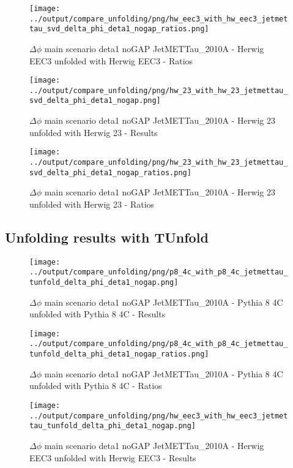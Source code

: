\documentclass[11pt]{book}
\begin{document}
\begin{figure}[ht]
\centering
\texttt{[image: ../output/compare\_unfolding/png/hw\_eec3\_with\_hw\_eec3\_jetmettau\_svd\_delta\_phi\_deta1\_nogap\_ratios.png]}
\caption{$\Delta\phi$ main scenario deta1 noGAP JetMETTau\_2010A - Herwig EEC3 unfolded with Herwig EEC3 - Ratios}
\label{hw_eec3_hw_eec3_jetmettau_svd_delta_phi_deta1_nogap_b}
\end{figure}

\begin{figure}[ht]
\centering
\texttt{[image: ../output/compare\_unfolding/png/hw\_23\_with\_hw\_23\_jetmettau\_svd\_delta\_phi\_deta1\_nogap.png]}
\caption{$\Delta\phi$ main scenario deta1 noGAP JetMETTau\_2010A - Herwig 23 unfolded with Herwig 23 - Results}
\label{hw_23_hw_23_jetmettau_svd_delta_phi_deta1_nogap_a}
\end{figure}

\begin{figure}[ht]
\centering
\texttt{[image: ../output/compare\_unfolding/png/hw\_23\_with\_hw\_23\_jetmettau\_svd\_delta\_phi\_deta1\_nogap\_ratios.png]}
\caption{$\Delta\phi$ main scenario deta1 noGAP JetMETTau\_2010A - Herwig 23 unfolded with Herwig 23 - Ratios}
\label{hw_23_hw_23_jetmettau_svd_delta_phi_deta1_nogap_b}
\end{figure}


\clearpage
\subsection{Unfolding results with TUnfold}

\begin{figure}[ht]
\centering
\texttt{[image: ../output/compare\_unfolding/png/p8\_4c\_with\_p8\_4c\_jetmettau\_tunfold\_delta\_phi\_deta1\_nogap.png]}
\caption{$\Delta\phi$ main scenario deta1 noGAP JetMETTau\_2010A - Pythia 8 4C unfolded with Pythia 8 4C - Results}
\label{p8_p8_jetmettau_tunfold_delta_phi_deta1_nogap_a}
\end{figure}

\begin{figure}[ht]
\centering
\texttt{[image: ../output/compare\_unfolding/png/p8\_4c\_with\_p8\_4c\_jetmettau\_tunfold\_delta\_phi\_deta1\_nogap\_ratios.png]}
\caption{$\Delta\phi$ main scenario deta1 noGAP JetMETTau\_2010A - Pythia 8 4C unfolded with Pythia 8 4C - Ratios}
\label{p8_p8_jetmettau_tunfold_delta_phi_deta1_nogap_b}
\end{figure}

\begin{figure}[ht]
\centering
\texttt{[image: ../output/compare\_unfolding/png/hw\_eec3\_with\_hw\_eec3\_jetmettau\_tunfold\_delta\_phi\_deta1\_nogap.png]}
\caption{$\Delta\phi$ main scenario deta1 noGAP JetMETTau\_2010A - Herwig EEC3 unfolded with Herwig EEC3 - Results}
\label{hw_eec3_hw_eec3_jetmettau_tunfold_delta_phi_deta1_nogap_a}
\end{figure}
\end{document}
